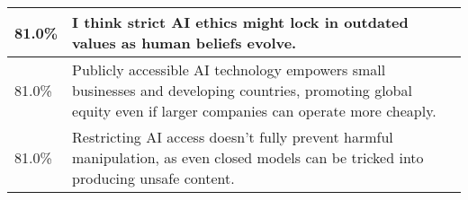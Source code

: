 \begin{longtable}{p{}p{}}
    \hline
    81.0\% & I think strict AI ethics might lock in outdated values as human beliefs evolve. \\
    \hline
    81.0\% & Publicly accessible AI technology empowers small businesses and developing countries, promoting global equity even if larger companies can operate more cheaply. \\
    \hline
    81.0\% & Restricting AI access doesn’t fully prevent harmful manipulation, as even closed models can be tricked into producing unsafe content. \\
    \hline
\end{longtable}
